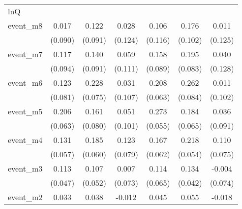 {\begin{tabular}{l*{6}{c}}
\hline
lnQ         &                     &                     &                     &                     &                     &                     \\
event\_m8    &       0.017         &       0.122         &       0.028         &       0.106         &       0.176         &       0.011         \\
            &     (0.090)         &     (0.091)         &     (0.124)         &     (0.116)         &     (0.102)         &     (0.125)         \\
[1em]
event\_m7    &       0.117         &       0.140         &       0.059         &       0.158         &       0.195\sym{*}  &       0.040         \\
            &     (0.094)         &     (0.091)         &     (0.111)         &     (0.089)         &     (0.083)         &     (0.128)         \\
[1em]
event\_m6    &       0.123         &       0.228\sym{**} &       0.031         &       0.208\sym{***}&       0.262\sym{**} &       0.011         \\
            &     (0.081)         &     (0.075)         &     (0.107)         &     (0.063)         &     (0.084)         &     (0.102)         \\
[1em]
event\_m5    &       0.206\sym{**} &       0.161\sym{*}  &       0.051         &       0.273\sym{***}&       0.184\sym{**} &       0.036         \\
            &     (0.063)         &     (0.080)         &     (0.101)         &     (0.055)         &     (0.065)         &     (0.091)         \\
[1em]
event\_m4    &       0.131\sym{*}  &       0.185\sym{**} &       0.123         &       0.167\sym{**} &       0.218\sym{***}&       0.110         \\
            &     (0.057)         &     (0.060)         &     (0.079)         &     (0.062)         &     (0.054)         &     (0.075)         \\
[1em]
event\_m3    &       0.113\sym{*}  &       0.107\sym{*}  &       0.007         &       0.114         &       0.134\sym{**} &      -0.004         \\
            &     (0.047)         &     (0.052)         &     (0.073)         &     (0.065)         &     (0.042)         &     (0.074)         \\
[1em]
event\_m2    &       0.033         &       0.038         &      -0.012         &       0.045         &       0.055         &      -0.018         \\

\end{tabular}}
